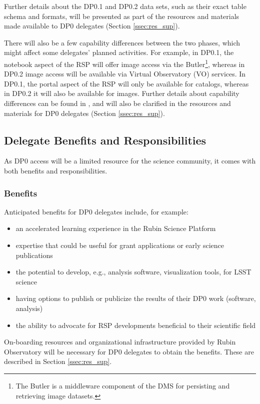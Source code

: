 \documentclass[DM,lsstdraft,authoryear,toc]{lsstdoc}
\begin{document}
Further details about the DP0.1 and DP0.2 data sets, such as their exact table schema and formats, will be presented as part of the resources and materials made available to DP0 delegates (Section \ref{ssec:res_sup}).

There will also be a few capability differences between the two phases, which might affect some delegates' planned activities.
For example, in DP0.1, the notebook aspect of the RSP will offer image access via the Butler\footnote{The Butler is a middleware component of the DMS for persisting and retrieving image datasets.}, whereas in DP0.2 image access will be available via Virtual Observatory (VO) services.
In DP0.1, the portal aspect of the RSP will only be available for catalogs, whereas in DP0.2 it will also be available for images.
Further details about capability differences can be found in , and will also be clarified in the resources and materials for DP0 delegates (Section \ref{ssec:res_sup}).


\subsection{Delegate Benefits and Responsibilities}\label{ssec:intro_del}

As DP0 access will be a limited resource for the science community, it comes with both benefits and responsibilities.

\subsubsection{Benefits}\label{sssec:intro_del_bene}

Anticipated benefits for DP0 delegates include, for example:
\begin{itemize}
\item an accelerated learning experience in the Rubin Science Platform
\item expertise that could be useful for grant applications or early science publications
\item the potential to develop, e.g., analysis software, visualization tools, for LSST science 
\item having options to publish or publicize the results of their DP0 work (software, analysis)
\item the ability to advocate for RSP developments beneficial to their scientific field
\end{itemize}

On-boarding resources and organizational infrastructure provided by Rubin Observatory will be necessary for DP0 delegates to obtain the benefits. These are described in Section \ref{ssec:res_sup}.
\end{document}

